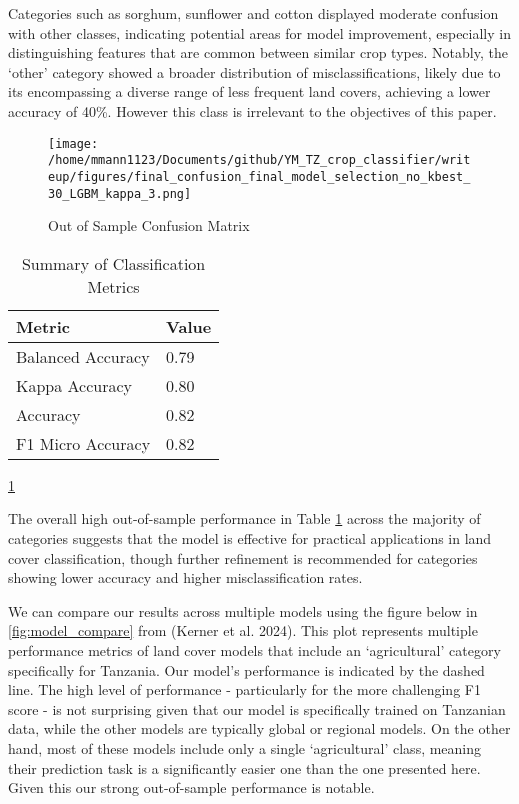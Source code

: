 \documentclass[
]{article}
\begin{document}
Categories such as sorghum, sunflower and cotton displayed moderate
confusion with other classes, indicating potential areas for model
improvement, especially in distinguishing features that are common
between similar crop types. Notably, the `other' category showed a
broader distribution of misclassifications, likely due to its
encompassing a diverse range of less frequent land covers, achieving a
lower accuracy of 40\%. However this class is irrelevant to the
objectives of this paper.

\begin{figure}[H]
    \centering
    \texttt{[image: /home/mmann1123/Documents/github/YM\_TZ\_crop\_classifier/writeup/figures/final\_confusion\_final\_model\_selection\_no\_kbest\_30\_LGBM\_kappa\_3.png]} %
    \caption{Out of Sample Confusion Matrix}
    \label{fig:oos_confusion} %
\end{figure}

\begin{table}[h!]
\centering
\begin{tabular}{@{}ll@{}}
\toprule
Metric              & Value                 \\ \midrule
Balanced Accuracy   & 0.79    \\
Kappa Accuracy      & 0.80    \\
Accuracy            & 0.82    \\
F1 Micro Accuracy   & 0.82    \\ \bottomrule
\end{tabular}
\caption{Summary of Classification Metrics}
\label{tab:metrics}
\ref{tab:metrics}
\end{table}

The overall high out-of-sample performance in Table \ref{tab:metrics}
across the majority of categories suggests that the model is effective
for practical applications in land cover classification, though further
refinement is recommended for categories showing lower accuracy and
higher misclassification rates.

We can compare our results across multiple models using the figure below
in \ref{fig:model_compare} from (Kerner et al. 2024). This plot
represents multiple performance metrics of land cover models that
include an `agricultural' category specifically for Tanzania. Our
model's performance is indicated by the dashed line. The high level of
performance - particularly for the more challenging F1 score - is not
surprising given that our model is specifically trained on Tanzanian
data, while the other models are typically global or regional models. On
the other hand, most of these models include only a single
`agricultural' class, meaning their prediction task is a significantly
easier one than the one presented here. Given this our strong
out-of-sample performance is notable.
\end{document}
